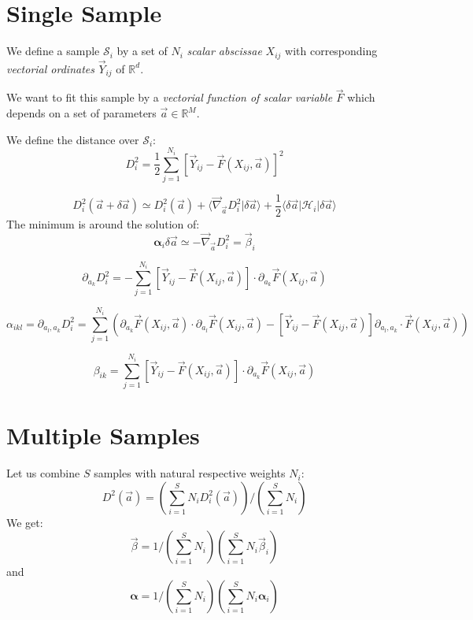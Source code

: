 \documentclass[aps,12pt]{revtex4}
\begin{document}
\section{Single Sample}
We define a sample $\mathcal{S}_i$ 
by a set of $N_i$ \emph{scalar abscissae} $X_{ij}$ with corresponding \emph{vectorial ordinates} $\vec{Y}_{ij}$ of $\mathbb{R}^d$.

We want to fit this sample by a \emph{vectorial function of scalar variable} $\vec{F}$ which depends on a set of parameters $\vec{a}\in\mathbb{R}^M$.

We define the distance over $\mathcal{S}_i$:
\begin{equation}
	D^2_i = \dfrac{1}{2}\sum_{j=1}^{N_i} \left[ \vec{Y}_{ij} - \vec{F}(X_{ij},\vec{a})\right]^2
\end{equation}

\begin{equation}
	D^2_i(\vec{a}+\delta\vec{a}) \simeq D^2_i(\vec{a}) + \langle \vec{\nabla}_{\vec{a}} D^2_i \vert \delta \vec{a} \rangle
	+ \dfrac{1}{2} \langle \delta\vec{a} \vert \mathcal{H}_i \vert \delta \vec{a} \rangle
\end{equation}
The minimum is around the solution of:
\begin{equation}
	\bm{\alpha}_i   \delta \vec{a}  \simeq -\vec{\nabla}_{\vec{a}} D^2_i = \vec{\beta}_i
\end{equation}

\begin{equation}
	 \partial_{a_k}D^2_i = -\sum_{j=1}^{N_i} \left[ \vec{Y}_{ij} - \vec{F}(X_{ij},\vec{a})\right] \cdot \partial_{a_k}\vec{F}(X_{ij},\vec{a})
\end{equation}

\begin{equation}
	\alpha_{ikl} = \partial_{a_l,a_k} D^2_i 
	= \sum_{j=1}^{N_i} \left(
	\partial_{a_k}\vec{F}(X_{ij},\vec{a}) \cdot \partial_{a_l}\vec{F}(X_{ij},\vec{a})
	- \left[ \vec{Y}_{ij} - \vec{F}(X_{ij},\vec{a})\right] \partial_{a_l,a_k}\cdot\vec{F}(X_{ij},\vec{a})  \right)
\end{equation}

\begin{equation}
	\beta_{ik} = \sum_{j=1}^{N_i} \left[ \vec{Y}_{ij} - \vec{F}(X_{ij},\vec{a})\right] \cdot \partial_{a_k}\vec{F}(X_{ij},\vec{a})
\end{equation}

\section{Multiple Samples}
Let us combine $S$ samples with natural respective weights $N_i$:
\begin{equation}
	 D^2(\vec{a}) = \left(\sum_{i=1}^S N_i D^2_i(\vec{a}) \right) /  \left(\sum_{i=1}^S N_i \right)
\end{equation}
We get:
\begin{equation}
	\vec{\beta} = 1/\left(\sum_{i=1}^S N_i \right) \left( \sum_{i=1}^S N_i \vec{\beta}_i\right)
\end{equation}
and
\begin{equation}
		 \bm{\alpha} = 1/\left(\sum_{i=1}^S N_i \right) \left( \sum_{i=1}^S N_i \bm{\alpha}_i\right)
\end{equation}
\end{document}
